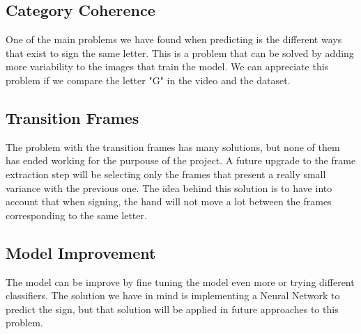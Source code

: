 \documentclass[9pt,a4paper,twoside]{tau-class/tau}
\begin{document}
    \subsection{Category Coherence}
        One of the main problems we have found when predicting is the different ways that exist to sign the same letter. This is a problem that can be solved by adding more variability to the images that train the model. We can appreciate this problem if we compare the letter "G" in the video and the dataset.
    \subsection{Transition Frames}
        The problem with the transition frames has many solutions, but none of them has ended working for the purpouse of the project. A future upgrade to the frame extraction step will be selecting only the frames that present a really small variance with the previous one.
        The idea behind this solution is to have into account that when signing, the hand will not move a lot between the frames corresponding to the same letter.
    \subsection{Model Improvement}
        The model can be improve by fine tuning the model even more or trying different classifiers. The solution we have in mind is implementing a Neural Network to predict the sign, but that solution will be applied in future approaches to this problem.



\end{document}
